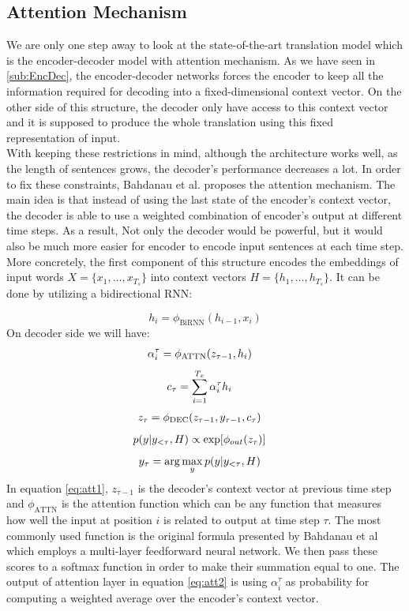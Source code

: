 \documentclass{sfuthesis}
\begin{document}
\subsection{Attention Mechanism} \label{sub:attention}
We are only one step away to look at the state-of-the-art translation model which is the encoder-decoder model with attention mechanism. As we have seen in \ref{sub:EncDec}, the encoder-decoder networks forces the encoder to keep all the information required for decoding into a fixed-dimensional context vector. On the other side of this structure, the decoder only have access to this context vector and it is supposed to produce the whole translation using this fixed representation of input.\\
With keeping these restrictions in mind, although the architecture works well, as the length of sentences grows, the decoder's performance decreases a lot. In order to fix these constraints, Bahdanau et al. \cite{Bahdanau:2014:Attention} proposes the attention mechanism. The main idea is that instead of using the last state of the encoder's context vector, the decoder is able to use a weighted combination of encoder's output at different time steps. As a result, Not only the decoder would be powerful, but it would also be much more easier for encoder to encode input sentences at each time step. \\
More concretely, the first component of this structure encodes the embeddings of input words $X=\{ x_1, \dots, x_{T_s} \}$ into context vectors $H = \{ h_1, \dots, h_{T_s} \}$. It can be done by utilizing a bidirectional RNN:

$$h_i = \phi_{\text{BiRNN}}(h_{i-1}, x_i)$$
On decoder side we will have:
\begin{align}
\centering
&\alpha_i^\tau = \phi_{\text{ATTN}}(z_{\tau -1}, h_i)  \label{eq:att1}
\end{align}
\begin{align}
\centering
&c_\tau = \sum_{i=1}^{T_x} \alpha_i^\tau h_i  \label{eq:att2}
\end{align}
\begin{align}
\centering
&z_\tau = \phi_{\text{DEC}}(z_{\tau -1}, y_{\tau -1}, c_\tau)  \label{eq:att3}
\end{align}
\begin{align}
\centering
&p(y|y_{<\tau}, H) \propto \text{exp} [\phi_{out} (z_{\tau}) ]  \label{eq:att4}
\end{align}
\begin{align}
\centering
&y_{\tau} = \arg \max_y p(y|y_{<\tau}, H)
\end{align}
In equation \ref{eq:att1}, $z_{\tau - 1}$ is the decoder's context vector at previous time step and $\phi_{\text{ATTN}}$ is the attention function which can be any function that measures how well the input at position $i$ is related to output at time step $\tau$. The most commonly used function is the original formula presented by Bahdanau et al \cite{Bahdanau:2014:Attention} which employs a multi-layer feedforward neural network. We then pass these scores to a softmax function in order to make their summation equal to one. The output of attention layer in equation \ref{eq:att2} is using $\alpha_i^\tau$ as probability for computing a weighted average over the encoder's context vector.
\end{document}
